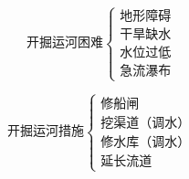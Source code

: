 \documentclass[UTF8]{ctexart}
\begin{document}
\par

\begin{multicols}{2}

    \[
        \textbf{开掘运河困难}
        \begin{cases}
            \text{地形障碍}\\
            \text{干旱缺水}\\
            \text{水位过低}\\
            \text{急流瀑布}
        \end{cases}
    \]

    \[
        \textbf{开掘运河措施}
        \begin{cases}
            \text{修船闸}\\
            \text{挖渠道（调水）}\\
            \text{修水库（调水）}\\
            \text{延长流道}
        \end{cases}
    \]
    
\end{multicols}

\par
\end{document}
